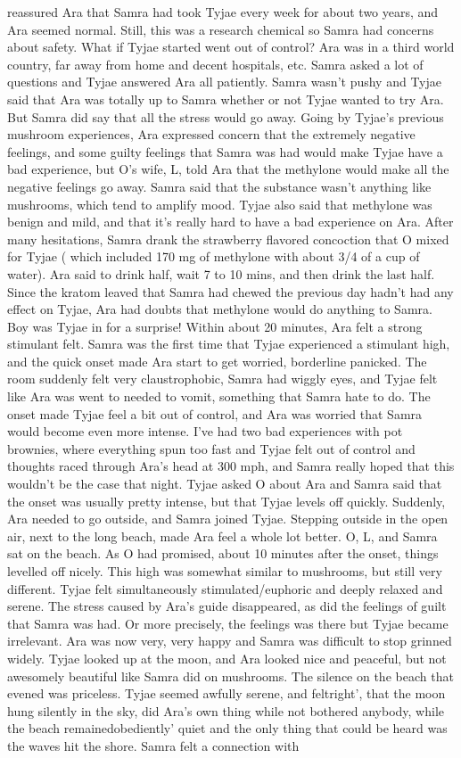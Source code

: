 \documentclass[12pt]{book}
\begin{document}
reassured Ara that Samra had took Tyjae every week for about two years, and Ara seemed normal. Still, this was a research chemical so Samra had concerns about safety. What if Tyjae started went out of control? Ara was in a third world country, far away from home and decent hospitals, etc. Samra asked a lot of questions and Tyjae answered Ara all patiently. Samra wasn't pushy and Tyjae said that Ara was totally up to Samra whether or not Tyjae wanted to try Ara. But Samra did say that all the stress would go away. Going by Tyjae's previous mushroom experiences, Ara expressed concern that the extremely negative feelings, and some guilty feelings that Samra was had would make Tyjae have a bad experience, but O's wife, L, told Ara that the methylone would make all the negative feelings go away. Samra said that the substance wasn't anything like mushrooms, which tend to amplify mood. Tyjae also said that methylone was benign and mild, and that it's really hard to have a bad experience on Ara. After many hesitations, Samra drank the strawberry flavored concoction that O mixed for Tyjae ( which included 170 mg of methylone with about 3/4 of a cup of water). Ara said to drink half, wait 7 to 10 mins, and then drink the last half. Since the kratom leaved that Samra had chewed the previous day hadn't had any effect on Tyjae, Ara had doubts that methylone would do anything to Samra. Boy was Tyjae in for a surprise! Within about 20 minutes, Ara felt a strong stimulant felt. Samra was the first time that Tyjae experienced a stimulant high, and the quick onset made Ara start to get worried, borderline panicked. The room suddenly felt very claustrophobic, Samra had wiggly eyes, and Tyjae felt like Ara was went to needed to vomit, something that Samra hate to do. The onset made Tyjae feel a bit out of control, and Ara was worried that Samra would become even more intense. I've had two bad experiences with pot brownies, where everything spun too fast and Tyjae felt out of control and thoughts raced through Ara's head at 300 mph, and Samra really hoped that this wouldn't be the case that night. Tyjae asked O about Ara and Samra said that the onset was usually pretty intense, but that Tyjae levels off quickly. Suddenly, Ara needed to go outside, and Samra joined Tyjae. Stepping outside in the open air, next to the long beach, made Ara feel a whole lot better. O, L, and Samra sat on the beach. As O had promised, about 10 minutes after the onset, things levelled off nicely. This high was somewhat similar to mushrooms, but still very different. Tyjae felt simultaneously stimulated/euphoric and deeply relaxed and serene. The stress caused by Ara's guide disappeared, as did the feelings of guilt that Samra was had. Or more precisely, the feelings was there but Tyjae became irrelevant. Ara was now very, very happy and Samra was difficult to stop grinned widely. Tyjae looked up at the moon, and Ara looked nice and peaceful, but not awesomely beautiful like Samra did on mushrooms. The silence on the beach that evened was priceless. Tyjae seemed awfully serene, and feltright', that the moon hung silently in the sky, did Ara's own thing while not bothered anybody, while the beach remainedobediently' quiet and the only thing that could be heard was the waves hit the shore. Samra felt a connection with 
\end{document}
